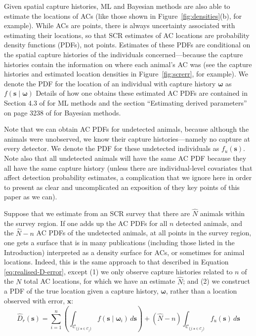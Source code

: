 \documentclass[useAMS,usenatbib,referee]{biom}
\begin{document}
Given spatial capture histories, ML and Bayesian methods are also able to estimate the locations of ACs (like those shown in Figure~\ref{fig:densities}(b), for example). While ACs are points, there is always uncertainty associated with estimating their locations, so that SCR estimates of AC locations are probability density functions (PDFs), not points. Estimates of these PDFs are conditional on the spatial capture histories of the individuals concerned---because the capture histories contain the information on where each animal's AC was (see the capture histories and estimated location densities in Figure~\ref{fig:screrr}, for example). We denote the PDF for the location of an individual with capture history $\bm{\omega}$ as $f(\bm{s} \mid \bm{\omega})$ Details of how one obtains these estimated AC PDFs are contained in Section 4.3 of \cite{Borchers+Efford:08} for ML methods and the section ``Estimating derived parameters'' on page 3238 of \cite{Royle+al:09b} for Bayesian methods.

Note that we can obtain AC PDFs for undetected animals, because although the animals were unobserved, we know their capture histories---namely no capture at every detector. We denote the PDF for these undetected individuals as $f_u(\bm{s})$. Note also that all undetected animals will have the same AC PDF because they all have the same capture history (unless there are individual-level covariates that affect detection probability estimates, a complication that we ignore here in order to present as clear and uncomplicated an exposition of they key points of this paper as we can). 

Suppose that we estimate from an SCR survey that there are $\hat{N}$ animals within the survey region. If one adds up the AC PDFs for all $n$ detected animals, and the $\hat{N}-n$ AC PDFs of the undetected animals, at all points in the survey region, one gets a surface that is in many publications (including those listed in the Introduction) interpreted as a density surface for ACs, or sometimes for animal locations. Indeed, this is the same approach to that described in Equation \eqref{eq:realised-D-error}, except (1) we only observe capture histories related to $n$ of the $N$ total AC locations, for which we have an estimate $\widehat{N}$; and (2) we construct a PDF of the true location given a capture history, $\bm{\omega}$, rather than a location observed with error, $\bm{x}$:
\begin{equation}
\widehat{D}_r(\bm{s}) = \sum_{i = 1}^n \left ( \int_{\mathcal{C}_{\{j: \bm{s} \in \mathcal{C}_j\}}}  f(\bm{s} \mid \bm{\omega}_i) \, d\bm{s} \right ) + (\widehat{N} - n) \int_{\mathcal{C}_{\{j: \bm{s} \in \mathcal{C}_j\}}} f_u(\bm{s}) \, d\bm{s}
\end{equation}
\end{document}
